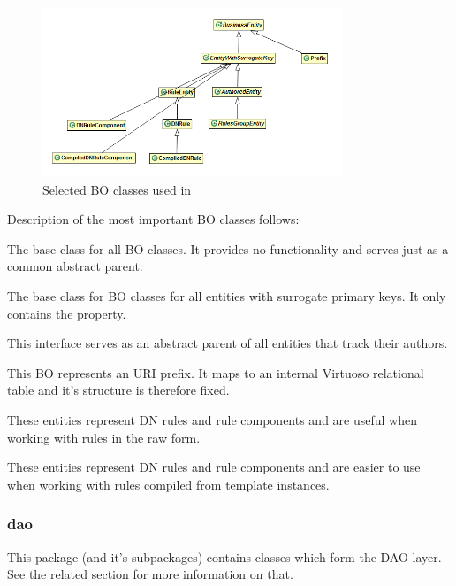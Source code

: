 \begin{figure}[htb]
    \centering
    \includegraphics[width=0.8\textwidth]{images/dia-fe-bo.png}
    \caption{Selected BO classes used in \FE}
	\label{fig:feBO}
\end{figure}

Description of the most important BO classes follows:

\begin{description}[style=nextline,font=\ttfamily]
	\item[BusinessEntity] The base class for all BO classes. It provides no functionality and serves just as a common abstract parent.
	\item[EntityWithSurrogateKey] The base class for BO classes for all entities with surrogate primary keys. It only contains the  property.
	\item[AuthoredEntity] This interface serves as an abstract parent of all entities that track their authors.
	\item[Prefix] This BO represents an URI prefix. It maps to an internal Virtuoso relational table and it's structure is therefore fixed.
	\item[DNRule and DNRuleComponent] These entities represent DN rules and rule components and are useful when working with rules in the raw form.
	\item[CompiledDNRule and CompiledDNRuleComponent] These entities represent DN rules and rule components and are easier to use when working with rules compiled from template instances.
\end{description}

\subsubsection{dao}

This package (and it's subpackages) contains classes which form the DAO layer. See the related section for more information on that.


